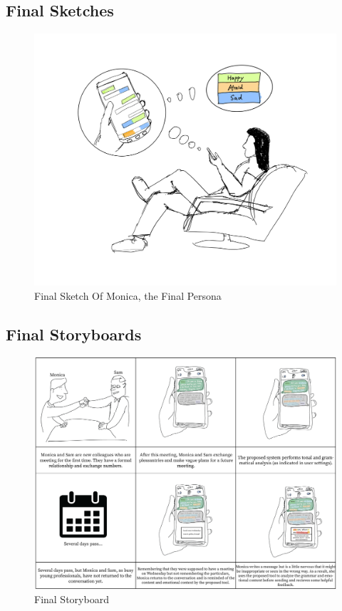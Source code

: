 \documentclass[acmsmall,screen,authorversion,nonacm]{acmart}
\begin{document}
\subsection{Final Sketches}
\begin{figure}[H]
\begin{center}
\includegraphics[width=1\linewidth]{./figures/Assignment_3/Final_sketches.png}
\caption{Final Sketch Of Monica, the Final Persona}
\label{fig:final_sketches}
\Description{}
\end{center}
\end{figure}

\subsection{Final Storyboards}
\begin{figure}[H]
\begin{center}
\includegraphics[width=1\linewidth]{./figures/Assignment_3/Final_Storyboard.png}
\caption{Final Storyboard}
\label{fig:final_storyboard}
\Description{}
\end{center}
\end{figure}
\end{document}
